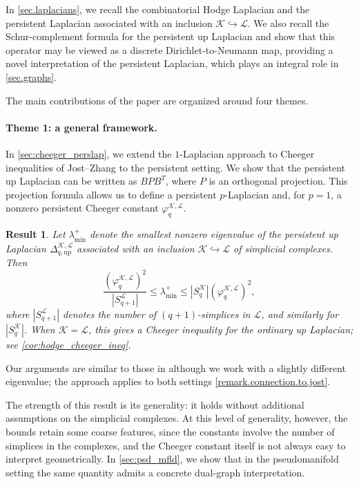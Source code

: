 \documentclass{article}
\newtheorem{resultx}{Result}
\newcommand{\KK}{\mathcal{K}}
\newcommand{\LL}{\mathcal{L}}
\begin{document}
In \cref{sec.laplacians}, we recall the combinatorial Hodge Laplacian and the persistent Laplacian associated with an inclusion \(\KK\hookrightarrow\LL\). We also recall the Schur-complement formula for the persistent up Laplacian and show that this operator may be viewed as a discrete Dirichlet-to-Neumann map, providing a novel interpretation of the persistent Laplacian, which plays an integral role in \cref{sec.graphs}.

The main contributions of the paper are organized around four themes. 
\paragraph{Theme 1: a general framework.} In \cref{sec:cheeger_perslap}, we extend the \(1\)-Laplacian approach to Cheeger inequalities of Jost--Zhang \cite{jost2024cheeger} to the persistent setting. We show that the persistent up Laplacian can be written as \(BPB^T\), where \(P\) is an orthogonal projection. This projection formula allows us to define a persistent \(p\)-Laplacian and, for \(p=1\), a nonzero persistent Cheeger constant \(\varphi_q^{\KK,\LL}\). 
\begin{resultx}
\label{res:general_persistent_cheeger}
Let \(\lambda_{\min}^+\) denote the smallest nonzero eigenvalue of the persistent up Laplacian $\Delta_{q,\mathrm{up}}^{\KK,\LL}$
associated with an inclusion \(\KK\hookrightarrow \LL\) of simplicial complexes. Then
\[
\frac{(\varphi_q^{\KK,\LL})^2}{|S_{q+1}^{\LL}|}
\leq
\lambda_{\min}^+
\leq
|S_q^\KK|(\varphi_q^{\KK,\LL})^2,
\]
 where $|S^\LL_{q+1}|$ denotes the number of $(q+1)$-simplices in $\LL$, and similarly for $|S_q^\KK|$. 
When \(\KK=\LL\), this gives a Cheeger inequality for the ordinary up Laplacian; see \cref{cor:hodge_cheeger_ineq}.
\end{resultx}
Our arguments are similar to those in \cite{jost2024cheeger} although we work with a slightly different eigenvalue; the approach applies to both settings \cref{remark.connection.to.jost}. 

The strength of this result is its generality: it holds without additional assumptions on the simplicial complexes. At this level of generality, however, the bounds retain some coarse features, since the constants involve the number of simplices in the complexes, and the Cheeger constant itself is not always easy to interpret geometrically. In \cref{sec:psd_mfld}, we show that in the pseudomanifold setting the same quantity admits a concrete dual-graph interpretation.
\end{document}
